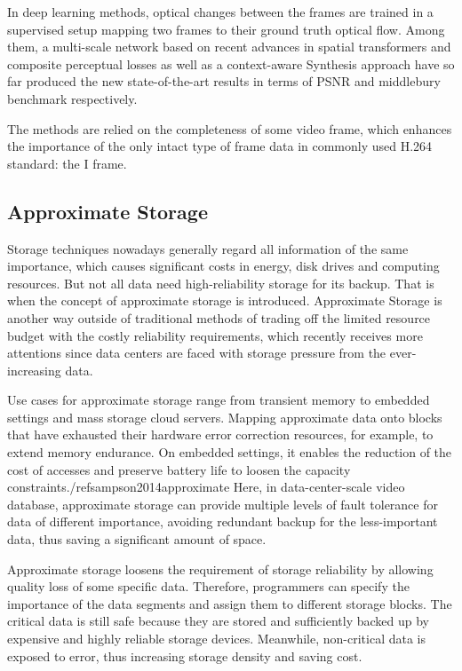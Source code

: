 \documentclass[sigconf]{acmart}
\begin{document}
In deep learning methods, optical changes between the frames are trained in a supervised setup mapping two frames to their ground truth optical flow. Among them, a multi-scale network\cite{van2017frame} based on recent advances in spatial transformers and composite perceptual losses as well as a context-aware Synthesis approach\cite{niklaus2018context} have so far produced the new state-of-the-art results in terms of PSNR and middlebury benchmark respectively.


The methods are relied on the completeness of some video frame, which enhances the importance of the only intact type of frame data in commonly used H.264 standard: the I frame.


\subsection{Approximate Storage}
Storage techniques nowadays generally regard all information of the same importance, which causes significant costs in energy, disk drives and computing resources. But not all data need high-reliability storage for its backup. That is when the concept of approximate storage is introduced. Approximate Storage is another way outside of traditional methods of trading off the limited resource budget with the costly reliability requirements, which recently receives more attentions since data centers are faced with storage pressure from the ever-increasing data.

Use cases for approximate storage range from transient memory to embedded settings and mass storage cloud servers. Mapping approximate data onto blocks that have exhausted their hardware error correction resources, for example, to extend memory endurance. On embedded settings, it enables the reduction of the cost of accesses and preserve battery life to loosen the capacity constraints./ref{sampson2014approximate} Here, in data-center-scale video database, approximate storage can provide multiple levels of fault tolerance for data of different importance, avoiding redundant backup for the less-important data, thus saving a significant amount of space.


Approximate storage loosens the requirement of storage reliability by allowing quality loss of some specific data. Therefore, programmers can specify the importance of the data segments and assign them to different storage blocks. The critical data is still safe because they are stored and sufficiently backed up by expensive and highly reliable storage devices. Meanwhile, non-critical data is exposed to error, thus increasing storage density and saving cost.
\end{document}
